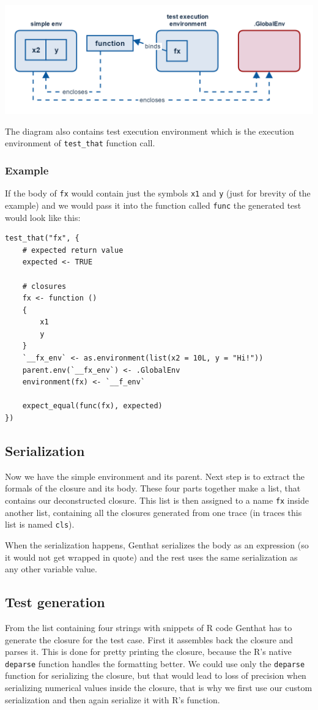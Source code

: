 \documentclass[thesis=B,english]{FITthesis}[2012/10/20]
\begin{document}
\includegraphics[width=\textwidth]{img/simple-env.png}

The diagram also contains test execution environment which is the execution environment of \verb|test_that| function call.

\subsubsection{Example}

If the body of \verb|fx| would contain just the symbols \verb|x1| and \verb|y| (just for brevity of the example) and we would pass it into the function called \verb|func| the generated test would look like this:

\begin{verbatim}
test_that("fx", {
    # expected return value
    expected <- TRUE

    # closures
    fx <- function ()
    {
        x1
        y
    }
    `__fx_env` <- as.environment(list(x2 = 10L, y = "Hi!"))
    parent.env(`__fx_env`) <- .GlobalEnv
    environment(fx) <- `__f_env`

    expect_equal(func(fx), expected)
})
\end{verbatim}

\subsection{Serialization}
Now we have the simple environment and its parent. Next step is to extract the formals of the closure and its body. These four parts together make a list, that contains our deconstructed closure. This list is then assigned to a name \verb|fx| inside another list, containing all the closures generated from one trace (in traces this list is named \verb|cls|).

When the serialization happens, Genthat serializes the body as an expression (so it would not get wrapped in quote) and the rest uses the same serialization as any other variable value.

\subsection{Test generation}
From the list containing four strings with snippets of R code Genthat has to generate the closure for the test case. First it assembles back the closure and parses it. This is done for pretty printing the closure, because the R’s native \verb|deparse| function handles the formatting better. We could use only the \verb|deparse| function for serializing the closure, but that would lead to loss of precision when serializing numerical values inside the closure, that is why we first use our custom serialization and then again serialize it with R’s function.
\end{document}

